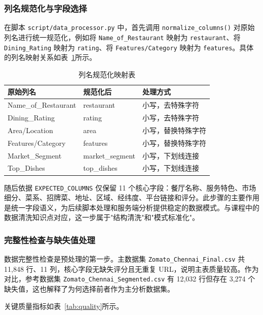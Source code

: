 \documentclass[11pt,a4paper]{article}
\begin{document}
\subsubsection{列名规范化与字段选择}

在脚本 \texttt{script/data\_processor.py} 中，首先调用 \texttt{normalize\_columns()} 对原始列名进行统一规范化，例如将 \texttt{Name\_of\_Restaurant} 映射为 \texttt{restaurant}、将 \texttt{Dining\_Rating} 映射为 \texttt{rating}、将 \texttt{Features/Category} 映射为 \texttt{features}。具体的列名映射关系如表~\ref{tab:column_mapping}所示。

\begin{table}[H]
\renewcommand{\arraystretch}{1.3}
\caption{列名规范化映射表}
\label{tab:column_mapping}
\centering
\begin{tabular}{lll}
\toprule
\textbf{原始列名} & \textbf{规范化后} & \textbf{处理方式} \\
\midrule
Name\_of\_Restaurant & restaurant & 小写，去特殊字符 \\
Dining\_Rating & rating & 小写，去特殊字符 \\
Area/Location & area & 小写，替换特殊字符 \\
Features/Category & features & 小写，替换特殊字符 \\
Market\_Segment & market\_segment & 小写，下划线连接 \\
Top\_Dishes & top\_dishes & 小写，下划线连接 \\
\bottomrule
\end{tabular}
\end{table}

随后依据 \texttt{EXPECTED\_COLUMNS} 仅保留 11 个核心字段：餐厅名称、服务特色、市场细分、菜系、招牌菜、地址、区域、经纬度、平台链接和评分。此步骤的主要作用是统一字段语义，为后续脚本处理和服务端分析提供稳定的数据模式。与课程中的数据清洗知识点对应，这一步属于"结构清洗"和"模式标准化"。

\subsubsection{完整性检查与缺失值处理}

数据完整性检查是预处理的第一步。主数据集 \texttt{Zomato\_Chennai\_Final.csv} 共 11,848 行、11 列，核心字段无缺失评分且无重复 URL，说明主表质量较高。作为对比，参考数据集 \texttt{Zomato\_Chennai\_Segmented.csv} 有 12,032 行但存在 3,274 个缺失值，这也解释了为何选择前者作为主分析数据集。

关键质量指标如表~\ref{tab:quality}所示。
\end{document}
